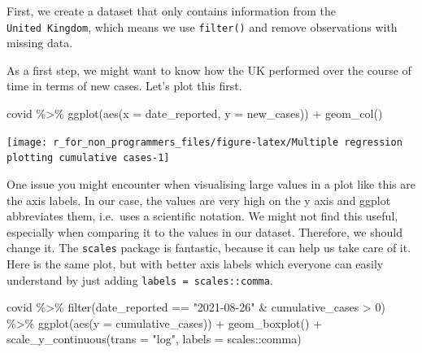 \documentclass[
]{book}
\newenvironment{Shaded}{\begin{snugshade}}{\end{snugshade}}
\newcommand{\AttributeTok}[1]{\textcolor[rgb]{0.77,0.63,0.00}{#1}}
\newcommand{\DecValTok}[1]{\textcolor[rgb]{0.00,0.00,0.81}{#1}}
\newcommand{\FunctionTok}[1]{\textcolor[rgb]{0.00,0.00,0.00}{#1}}
\newcommand{\NormalTok}[1]{#1}
\newcommand{\SpecialCharTok}[1]{\textcolor[rgb]{0.00,0.00,0.00}{#1}}
\newcommand{\StringTok}[1]{\textcolor[rgb]{0.31,0.60,0.02}{#1}}
\begin{document}
First, we create a dataset that only contains information from the \texttt{United\ Kingdom}, which means we use \texttt{filter()} and remove observations with missing data.

As a first step, we might want to know how the UK performed over the course of time in terms of new cases. Let's plot this first.

\begin{Shaded}
\begin{Highlighting}[]
\NormalTok{covid }\SpecialCharTok{\%\textgreater{}\%}
  \FunctionTok{ggplot}\NormalTok{(}\FunctionTok{aes}\NormalTok{(}\AttributeTok{x =}\NormalTok{ date\_reported,}
             \AttributeTok{y =}\NormalTok{ new\_cases)) }\SpecialCharTok{+}
  \FunctionTok{geom\_col}\NormalTok{()}
\end{Highlighting}
\end{Shaded}

\begin{center}\texttt{[image: r\_for\_non\_programmers\_files/figure-latex/Multiple regression plotting cumulative cases-1]} \end{center}

One issue you might encounter when visualising large values in a plot like this are the axis labels. In our case, the values are very high on the y axis and ggplot abbreviates them, i.e.~uses a scientific notation. We might not find this useful, especially when comparing it to the values in our dataset. Therefore, we should change it. The \texttt{scales} package is fantastic, because it can help us take care of it. Here is the same plot, but with better axis labels which everyone can easily understand by just adding \texttt{labels\ =\ scales::comma}.

\begin{Shaded}
\begin{Highlighting}[]
\NormalTok{covid }\SpecialCharTok{\%\textgreater{}\%}
  \FunctionTok{filter}\NormalTok{(date\_reported }\SpecialCharTok{==} \StringTok{"2021{-}08{-}26"} \SpecialCharTok{\&}\NormalTok{ cumulative\_cases }\SpecialCharTok{\textgreater{}} \DecValTok{0}\NormalTok{) }\SpecialCharTok{\%\textgreater{}\%} 
  \FunctionTok{ggplot}\NormalTok{(}\FunctionTok{aes}\NormalTok{(}\AttributeTok{y =}\NormalTok{ cumulative\_cases)) }\SpecialCharTok{+}
  \FunctionTok{geom\_boxplot}\NormalTok{() }\SpecialCharTok{+} 
  \FunctionTok{scale\_y\_continuous}\NormalTok{(}\AttributeTok{trans =} \StringTok{"log"}\NormalTok{,}
                     \AttributeTok{labels =}\NormalTok{ scales}\SpecialCharTok{::}\NormalTok{comma)}
\end{Highlighting}
\end{Shaded}
\end{document}
